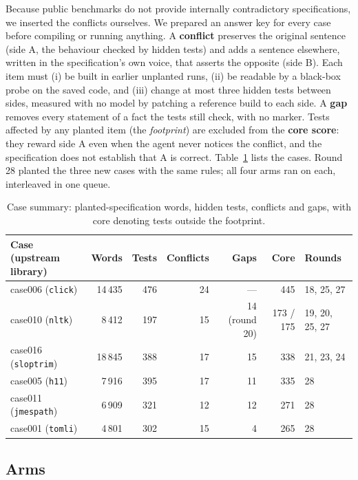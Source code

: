 \documentclass{article}
\newcommand{\code}[1]{\texttt{#1}}
\begin{document}
Because public benchmarks do not provide internally contradictory specifications, we inserted the conflicts ourselves. We prepared an answer key for every case before compiling or running anything. A \textbf{conflict} preserves the original sentence (side A, the behaviour checked by hidden tests) and adds a sentence elsewhere, written in the specification's own voice, that asserts the opposite (side B). Each item must (i) be built in earlier unplanted runs, (ii) be readable by a black-box probe on
the saved code, and (iii) change at most three hidden tests between sides, measured with no model by
patching a reference build to each side. A \textbf{gap} removes every statement of a fact the tests still
check, with no marker. Tests affected by any planted item (the \emph{footprint}) are excluded from the
\textbf{core score}: they reward side A even when the agent never notices the conflict, and the specification does not establish that A is correct. Table~\ref{tab:cases} lists the cases. Round 28 planted the three new cases with the same
rules; all four arms ran on each, interleaved in one queue.

\begin{table}[t]
\caption{Case summary: planted-specification words, hidden tests, conflicts and gaps, with core denoting tests outside the footprint.}
\label{tab:cases}
\centering\small
\begin{tabular}{lrrrrrl}
\toprule
Case (upstream library) & Words & Tests & Conflicts & Gaps & Core & Rounds \\
\midrule
case006 (\code{click})    & 14\,435 & 476 & 24 & --- & 445 & 18, 25, 27 \\
case010 (\code{nltk})     &  8\,412 & 197 & 15 & 14 (round 20) & 173 / 175 & 19, 20, 25, 27 \\
case016 (\code{sloptrim}) & 18\,845 & 388 & 17 & 15 & 338 & 21, 23, 24 \\
case005 (\code{h11})      &  7\,916 & 395 & 17 & 11 & 335 & 28 \\
case011 (\code{jmespath}) &  6\,909 & 321 & 12 & 12 & 271 & 28 \\
case001 (\code{tomli})    &  4\,801 & 302 & 15 & 4  & 265 & 28 \\
\bottomrule
\end{tabular}
\end{table}

\subsection{Arms}
\end{document}
